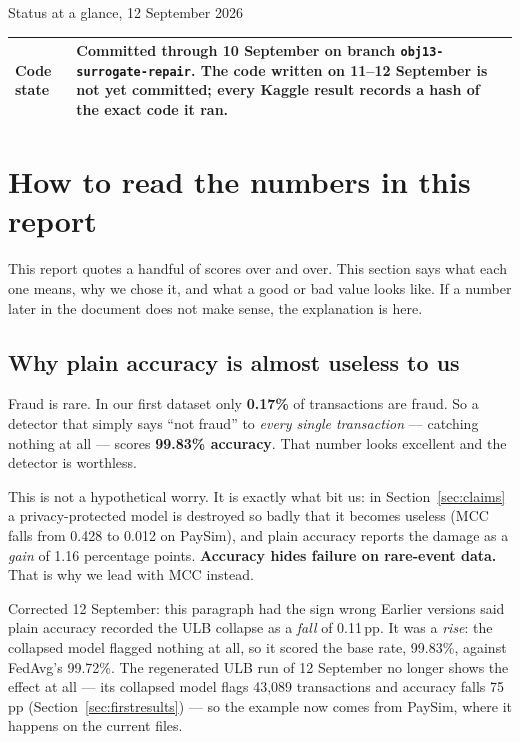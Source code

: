 \documentclass[11pt]{article}
\begin{document}
\begin{keybox}{Status at a glance, 12 September 2026}
\begin{tabularx}{\linewidth}{@{}p{4.7cm} X@{}}
\textbf{Code state} & Committed through 10 September on branch \texttt{obj13-surrogate-repair}. The code written on 11--12 September is not yet committed; every Kaggle result records a hash of the exact code it ran. \\
\bottomrule
\end{tabularx}
\end{keybox}

\section{How to read the numbers in this report}
\label{sec:scores}

This report quotes a handful of scores over and over. This section says what each one means, why we
chose it, and what a good or bad value looks like. If a number later in the document does not make
sense, the explanation is here.

\subsection{Why plain accuracy is almost useless to us}

Fraud is rare. In our first dataset only \textbf{0.17\%} of transactions are fraud. So a detector that
simply says ``not fraud'' to \emph{every single transaction} --- catching nothing at all --- scores
\textbf{99.83\% accuracy}. That number looks excellent and the detector is worthless.

This is not a hypothetical worry. It is exactly what bit us: in Section~\ref{sec:claims} a
privacy-protected model is destroyed so badly that it becomes useless (MCC falls from 0.428 to 0.012 on
PaySim), and plain accuracy reports the damage as a \emph{gain} of 1.16 percentage points.
\textbf{Accuracy hides failure on rare-event data.} That is why we lead with MCC instead.

\begin{warnbox}{Corrected 12 September: this paragraph had the sign wrong}
Earlier versions said plain accuracy recorded the ULB collapse as a \emph{fall} of 0.11\,pp. It was a
\emph{rise}: the collapsed model flagged nothing at all, so it scored the base rate, 99.83\%, against
FedAvg's 99.72\%. The regenerated ULB run of 12 September no longer shows the effect at all --- its
collapsed model flags 43{,}089 transactions and accuracy falls 75\,pp (Section~\ref{sec:firstresults}) ---
so the example now comes from PaySim, where it happens on the current files.
\end{warnbox}
\end{document}
